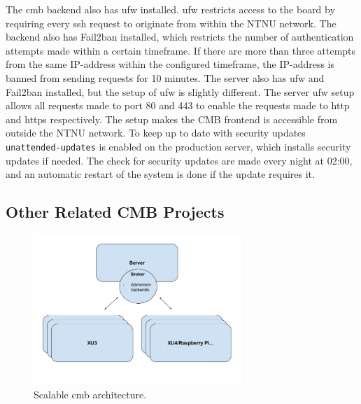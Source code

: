 The \gls{cmb} backend also has \gls{ufw} \cite{UFW} installed. \gls{ufw} restricts access to the board by requiring every \gls{ssh} request to originate from within the NTNU network. The backend also has Fail2ban  \cite{FAIL2BAN} installed, which restricts the number of authentication attempts made within a certain timeframe. If there are more than three attempts from the same IP-address within the configured timeframe, the IP-address is banned from sending requests for 10 minutes. The server also has \gls{ufw} and Fail2ban installed, but the setup of \gls{ufw} is slightly different. The server \gls{ufw} setup allows all requests made to port 80 and 443 to enable the requests made to \gls{http} and \gls{https} respectively. The setup makes the CMB frontend is accessible from outside the NTNU network. To keep up to date with security updates \texttt{unattended-updates} \cite{UNATTENDED} is enabled on the production server, which installs security updates if needed. The check for security updates are made every night at 02:00, and an automatic restart of the system is done if the update requires it.


\subsection{Other Related CMB Projects}
\label{subsec:related-proj}
\begin{figure}[ct!]
  \centering
  \includegraphics[width=0.7\textwidth]{figs/cmb_scale_arch.jpg}
  \caption[Scalable Climbing Mont Blanc architecture.]{Scalable \gls{cmb} architecture.}
  \label{fig:cmb-scale-arch}
\end{figure}

